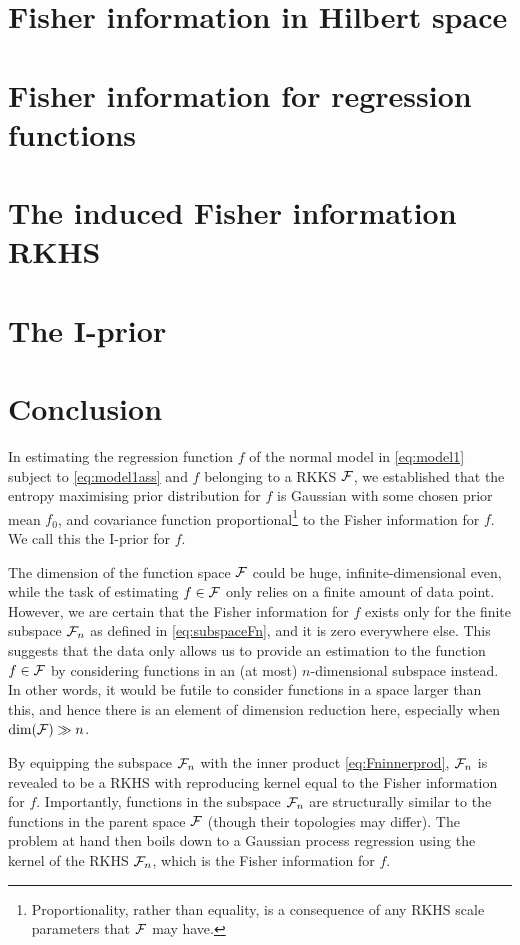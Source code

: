 \documentclass[showframe,11pt,twoside,openright]{report}
\begin{document}
\section{Fisher information in Hilbert space}
\label{sec:fihilbert}


\section{Fisher information for regression functions}
\label{sec:firegfun}


\section{The induced Fisher information RKHS}
\label{sec:inducedFisherRKHS}


\section{The I-prior}


\section{Conclusion}

In estimating the regression function $f$ of the normal model in \cref{eq:model1} subject to \cref{eq:model1ass} and $f$ belonging to a RKKS ${\mathcal F}$, we established that the entropy maximising prior distribution for $f$ is Gaussian with some chosen prior mean $f_0$, and covariance function proportional\footnote{Proportionality, rather than equality, is a consequence of any RKHS scale parameters that ${\mathcal F}$ may have.} to the Fisher information for $f$.
We call this the I-prior for $f$.

The dimension of the function space ${\mathcal F}$ could be huge, infinite-dimensional even, while the task of estimating $f\in{\mathcal F}$ only relies on a finite amount of data point.
However, we are certain that the Fisher information for $f$ exists only for the finite subspace ${\mathcal F}_n$ as defined in \cref{eq:subspaceFn}, and it is zero everywhere else.
This suggests that the data only allows us to provide an estimation to the function $f\in{\mathcal F}$ by considering functions in an (at most) $n$-dimensional subspace instead.
In other words, it would be futile to consider functions in a space larger than this, and hence there is an element of dimension reduction here, especially when $\dim({\mathcal F}) \gg n$.

By equipping the subspace ${\mathcal F}_n$ with the inner product \cref{eq:Fninnerprod}, ${\mathcal F}_n$ is revealed to be a RKHS with reproducing kernel equal to the Fisher information for $f$.
Importantly, functions in the subspace ${\mathcal F}_n$ are structurally similar to the functions in the parent space ${\mathcal F}$ (though their topologies may differ).
The problem at hand then boils down to a Gaussian process regression using the kernel of the RKHS ${\mathcal F}_n$, which is the Fisher information for $f$.

\hClosingStuffStandalone
\end{document}

